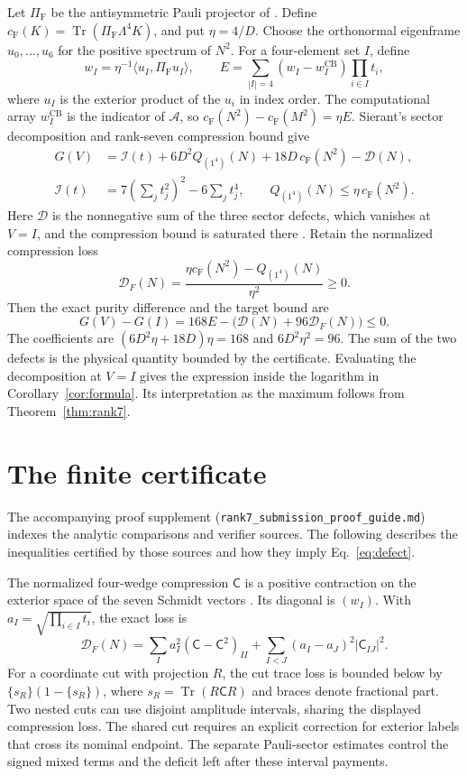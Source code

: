 \documentclass[11pt]{article}
\newcommand{\tr}{\operatorname{Tr}}
\newcommand{\cF}{c_{\mathrm F}}
\newcommand{\pF}{\Pi_{\mathrm F}}
\newcommand{\CB}{\mathrm{CB}}
\begin{document}
Let \(\pF\) be the antisymmetric Pauli projector of
\cite[Eq.~(39)]{sierant}. Define
\(\cF(K)=\tr(\pF\Lambda^4K)\), and put \(\eta=4/D\). Choose the
orthonormal eigenframe \(u_0,\ldots,u_6\) for the positive spectrum
of \(N^2\). For a four-element set \(I\), define
\[
 w_I=\eta^{-1}\langle u_I,\pF u_I\rangle,\qquad
 E=\sum_{|I|=4}(w_I-w_I^{\CB})\prod_{i\in I}t_i,
\]
where \(u_I\) is the exterior product of the \(u_i\) in index order.
The computational array \(w_I^{\CB}\) is the indicator of
\(\mathcal A\), so \(\cF(N^2)-\cF(M^2)=\eta E\).
Sierant's sector decomposition and rank-seven compression bound give
\begin{align*}
 G(V)&=\mathcal I(t)+6D^2 Q_{(1^4)}(N)
                  +18D\,\cF(N^2)-\mathcal D(N),\\
 \mathcal I(t)&=7\left(\sum_jt_j^2\right)^2-6\sum_jt_j^4,
 \qquad Q_{(1^4)}(N)\le\eta\,\cF(N^2).
\end{align*}
Here \(\mathcal D\) is the nonnegative sum of the three sector
defects, which vanishes at \(V=I\), and the compression bound is
saturated there
\cite[Proposition 2, Eq.~(175), and Theorem 7]{sierant}.
Retain the normalized compression loss
\[
 \mathcal D_F(N)
 =\frac{\eta\cF(N^2)-Q_{(1^4)}(N)}{\eta^2}\ge0 .
\]
Then the exact purity difference and the target bound are
\begin{equation}\label{eq:defect}
 G(V)-G(I)=168E-\big(\mathcal D(N)+96\mathcal D_F(N)\big)\le0.
\end{equation}
The coefficients are \((6D^2\eta+18D)\eta=168\) and
\(6D^2\eta^2=96\). The sum of the two defects is the physical
quantity bounded by the certificate. Evaluating the
decomposition at \(V=I\) gives the expression inside the logarithm in
Corollary~\ref{cor:formula}. Its interpretation as the maximum follows
from Theorem~\ref{thm:rank7}.

\section{The finite certificate}

The accompanying proof supplement
(\texttt{rank7\_submission\_proof\_guide.md}) indexes the analytic
comparisons and verifier sources.
The following describes the inequalities certified by those sources and
how they imply Eq.~\eqref{eq:defect}.

The normalized four-wedge compression \(\mathsf C\) is a
positive contraction on the exterior space of the seven
Schmidt vectors \cite[Theorem 22]{sierant}. Its diagonal is
\((w_I)\). With \(a_I=\sqrt{\prod_{i\in I}t_i}\), the exact loss is
\[
 \mathcal D_F(N)=
 \sum_I a_I^2(\mathsf C-\mathsf C^2)_{II}
 +\sum_{I<J}(a_I-a_J)^2|\mathsf C_{IJ}|^2.
\]
For a coordinate cut with projection \(R\), the cut trace loss
is bounded below by \(\{s_R\}(1-\{s_R\})\), where
\(s_R=\tr(R\mathsf C R)\) and braces denote fractional part.
Two nested cuts can use disjoint amplitude intervals, sharing
the displayed compression loss. The shared cut requires an
explicit correction for exterior labels that cross its nominal
endpoint. The separate Pauli-sector estimates control the signed
mixed terms and the deficit left after these interval payments.
\end{document}
